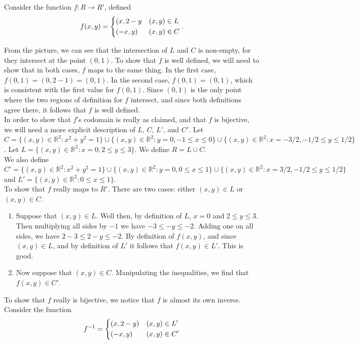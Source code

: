 \documentclass{article}
\newcommand{\inv}[1]{#1^{-1}}
\newcommand{\R}{\mathbb{R}}
\newcommand{\inv}[1]{#1^{-1}}
\newcommand{\R}{\mathbb{R}}
\begin{document}
Consider the function $f:R\rightarrow R'$, defined 
$$
f(x,y) = \begin{dcases}
(x,2-y & (x,y)\in L\\
(-x,y) & (x,y)\in C
\end{dcases}
.$$

From the picture, we can see that the intersection of $L$ and $C$ is non-empty, for they intersect at the point $(0,1)$. To show that $f$ is well defined, we will need to show that in both cases, $f$ maps to the same thing. In the first case, $f(0,1) = (0,2-1) = (0,1)$. In the second case, $f(0,1) = (0,1)$, which is consistent with the first value for $f(0,1)$. Since $(0,1)$ is the only point where the two regions of definition for $f$ intersect, and since both definitions agree there, it follows that $f$ is well defined. \\

In order to show that $f$'s codomain is really as claimed, and that $f$ is bijective, we will need a more explicit description of $L$, $C$, $L'$, and $C'$. Let $C = \{(x,y)\in \R^2:x^2 + y^2 = 1\}\cup \{(x,y)\in \R^2: y = 0, -1\le x\le 0 \}\cup \{(x,y)\in \R^2: x = -3/2, -1/2 \le y \le 1/2 \}$. Let $L = \{ (x,y)\in \R^2 : x = 0, 2\le y \le 3 \}$. We define $R = L\cup C$.\\

We also define $C' = \{(x,y)\in \R^2 : x^2 + y^2 = 1\}\cup \{(x,y)\in \R^2 : y = 0, 0\le x \le 1\}\cup \{(x,y)\in \R^2 : x = 3/2, -1/2 \le y \le 1/2\}$ and $L' = \{(x,y)\in \R^2: 0\le x\le 1\}$.\\

To show that $f$ really maps to $R'$. There are two cases: either $(x,y)\in L$ or $ (x,y)\in C $.
\begin{enumerate}
    \item Suppose that $(x,y)\in L$. Well then, by definition of $L$, $x = 0$ and $2\le y \le 3$. Then multiplying all sides by $-1$ we have $-3 \le -y \le -2$. Adding one on all sides, we have $2-3 \le 2-y \le -2$. By definition of $f(x,y)$, and since $(x,y)\in L$, and by definition of $L'$ it follows that $f(x,y)\in L'$. This is good.\\
    \item Now suppose that $(x,y)\in C$. Manipulating the inequalities, we find that $f(x,y)\in C'$.
\end{enumerate}

To show that $f$ really is bijective, we notice that $f$ is almost its own inverse. Consider the function
$$\inv{f} = \begin{dcases}
(x,2-y) & (x,y)\in L'\\
(-x,y) & (x,y)\in C'
\end{dcases}$$
\end{document}
